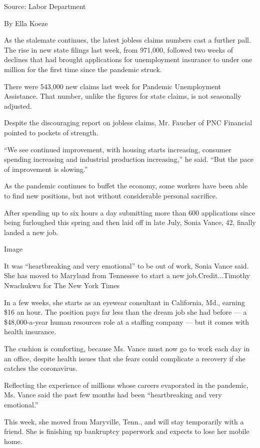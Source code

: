 Source: Labor Department

By Ella Koeze

As the stalemate continues, the latest jobless claims numbers cast a
further pall. The rise in new state filings last week, from 971,000,
followed two weeks of declines that had brought applications for
unemployment insurance to under one million for the first time since the
pandemic struck.

There were 543,000 new claims last week for Pandemic Unemployment
Assistance. That number, unlike the figures for state claims, is not
seasonally adjusted.

Despite the discouraging report on jobless claims, Mr. Faucher of PNC
Financial pointed to pockets of strength.

``We see continued improvement, with housing starts increasing, consumer
spending increasing and industrial production increasing,'' he said.
``But the pace of improvement is slowing.''

As the pandemic continues to buffet the economy, some workers have been
able to find new positions, but not without considerable personal
sacrifice.

After spending up to six hours a day submitting more than 600
applications since being furloughed this spring and then laid off in
late July, Sonia Vance, 42, finally landed a new job.

Image

It was ``heartbreaking and very emotional'' to be out of work, Sonia
Vance said. She has moved to Maryland from Tennessee to start a new
job.Credit...Timothy Nwachukwu for The New York Times

In a few weeks, she starts as an eyewear consultant in California, Md.,
earning \$16 an hour. The position pays far less than the dream job she
had before --- a \$48,000-a-year human resources role at a staffing
company --- but it comes with health insurance.

The cushion is comforting, because Ms. Vance must now go to work each
day in an office, despite health issues that she fears could complicate
a recovery if she catches the coronavirus.

Reflecting the experience of millions whose careers evaporated in the
pandemic, Ms. Vance said the past few months had been ``heartbreaking
and very emotional.''

This week, she moved from Maryville, Tenn., and will stay temporarily
with a friend. She is finishing up bankruptcy paperwork and expects to
lose her mobile home.

